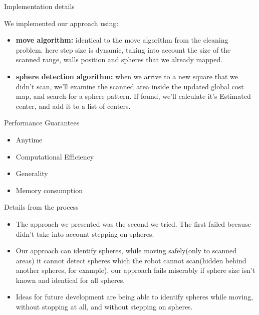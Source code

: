\documentclass[10pt]{beamer}
\begin{document}
 \begin{frame}{Implementation details}

 We implemented our approach using:
  \begin{itemize}
     \item \textbf{move algorithm:}
     identical to the move algorithm from the cleaning problem. here step size is dynamic, taking into account the size of the scanned range, walls position and spheres that we already mapped.
         \item  \textbf{sphere detection algorithm:}
         when we arrive to a new square that we didn't scan, we'll examine the scanned area inside the updated global cost map, and search for a sphere pattern. If found, we'll calculate it's Estimated center, and add it to a list of centers.
\end{itemize}
 \end{frame}


\begin{frame}{Performance Guarantees}

\begin{itemize}
		\item Anytime 
		\item Computational Efficiency 
		\item Generality
		\item Memory consumption
	\end{itemize}
	

\end{frame}



\begin{frame}{Details from the process}

\begin{itemize}
    \item The approach we presented was the second we tried. The first failed because didn't take into account stepping on spheres.
    \item Our approach can identify spheres, while moving safely(only to scanned areas) it cannot detect spheres which the robot cannot scan(hidden behind another spheres, for example). our approach fails miserably if sphere size isn't known and identical for all spheres.
    \item Ideas for future development are being able to identify spheres while moving, without stopping at all, and without stepping on spheres.
\end{itemize}

\end{frame}
\end{document}
